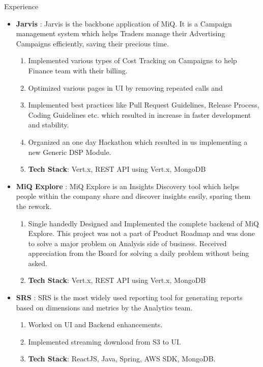 \documentclass{resume} %
\begin{document}
\begin{rSection}{Experience}
\begin{itemize}
    \item {\bf{Jarvis}} : Jarvis is the backbone application of MiQ. It is a Campaign management system which helps Traders manage their Advertising Campaigns efficiently, saving their precious time. 
    \begin{enumerate}
        \item Implemented various types of Cost Tracking on Campaigns to help Finance team with their billing.
        \item Optimized various pages in UI by removing repeated calls and 
        \item Implemented best practices like Pull Request Guidelines, Release Process, Coding Guidelines etc. which resulted in increase in faster development and stability.
        \item Organized an one day Hackathon which resulted in us implementing a new Generic DSP Module.
        \item {\bf{Tech Stack}}: Vert.x, REST API using Vert.x, MongoDB
    \end{enumerate}
    \item {\bf{MiQ Explore}} : MiQ Explore is an Insights Discovery tool which helps people within the company share and discover insights easily, sparing them the rework.
    \begin{enumerate}
        \item Single handedly Designed and Implemented the complete backend of MiQ Explore. This project was not a part of Product Roadmap and was done to solve a major problem on Analysis side of business. Received appreciation from the Board for solving a daily problem without being asked.
        \item {\bf{Tech Stack}}: Vert.x, REST API using Vert.x, MongoDB
    \end{enumerate}
    \item {\bf{SRS}} : SRS is the most widely used reporting tool for generating reports based on dimensions and metrics by the Analytics team.
    \begin{enumerate}
        \item Worked on UI and Backend enhancements.
        \item Implemented streaming download from S3 to UI.
        \item {\bf{Tech Stack}}: ReactJS, Java, Spring, AWS SDK, MongoDB. 
    \end{enumerate}
\end{itemize}



\end{rSection}
\end{document}
